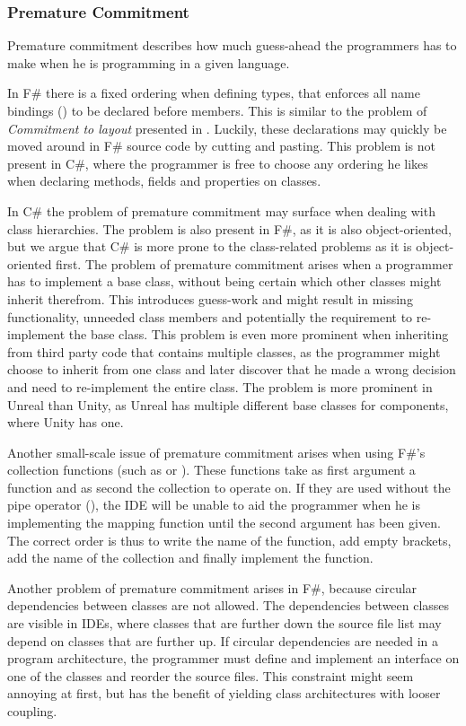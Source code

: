 \subsubsection{Premature Commitment}
Premature commitment describes how much guess-ahead the programmers has to make when he is programming in a given language. 

In F\# there is a fixed ordering when defining types, that enforces all name bindings () to be declared before members. This is similar to the problem of \textit{Commitment to layout} presented in \cite{green1996usability}. Luckily, these declarations may quickly be moved around in F\# source code by cutting and pasting. This problem is not present in C\#, where the programmer is free to choose any ordering he likes when declaring methods, fields and properties on classes.

In C\# the problem of premature commitment may surface when dealing with class hierarchies. The problem is also present in F\#, as it is also object-oriented, but we argue that C\# is more prone to the class-related problems as it is object-oriented first. The problem of premature commitment arises when a programmer has to implement a base class, without being certain which other classes might inherit therefrom. This introduces guess-work and might result in missing functionality, unneeded class members and potentially the requirement to re-implement the base class. This problem is even more prominent when inheriting from third party code that contains multiple classes, as the programmer might choose to inherit from one class and later discover that he made a wrong decision and need to re-implement the entire class. The problem is more prominent in Unreal than Unity, as Unreal has multiple different base classes for components\cite{unreal:components}, where Unity has one.

Another small-scale issue of premature commitment arises when using F\#'s collection functions (such as  or ). These functions take as first argument a function and as second the collection to operate on. If they are used without the pipe operator (\ttt{|\textgreater}), the \gls{IDE} will be unable to aid the programmer when he is implementing the mapping function until the second argument has been given. The correct order is thus to write the name of the function, add empty brackets, add the name of the collection and finally implement the function.

Another problem of premature commitment arises in F\#, because circular dependencies between classes are not allowed. The dependencies between classes are visible in \glspl{IDE}, where classes that are further down the source file list may depend on classes that are further up. If circular dependencies are needed in a program architecture, the programmer must define and implement an interface on one of the classes and reorder the source files. This constraint might seem annoying at first, but has the benefit of yielding class architectures with looser coupling\cite{interfaces:and:coupling}. 